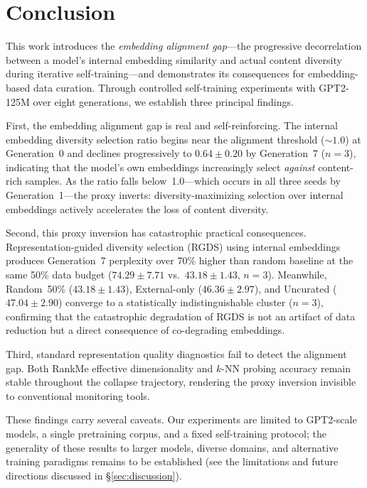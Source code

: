 \section{Conclusion}
\label{sec:conclusion}

This work introduces the \emph{embedding alignment gap}---the progressive decorrelation between a model's internal embedding similarity and actual content diversity during iterative self-training---and demonstrates its consequences for embedding-based data curation. Through controlled self-training experiments with GPT2-125M over eight generations, we establish three principal findings.

First, the embedding alignment gap is real and self-reinforcing. The internal embedding diversity selection ratio begins near the alignment threshold (${\sim}1.0$) at Generation~0 and declines progressively to $0.64 \pm 0.20$ by Generation~7 ($n{=}3$), indicating that the model's own embeddings increasingly select \emph{against} content-rich samples. As the ratio falls below~1.0---which occurs in all three seeds by Generation~1---the proxy inverts: diversity-maximizing selection over internal embeddings actively accelerates the loss of content diversity.

Second, this proxy inversion has catastrophic practical consequences. Representation-guided diversity selection (RGDS) using internal embeddings produces Generation~7 perplexity over 70\% higher than random baseline at the same 50\% data budget ($74.29 \pm 7.71$ vs.\ $43.18 \pm 1.43$, $n{=}3$). Meanwhile, Random~50\% ($43.18 \pm 1.43$), External-only ($46.36 \pm 2.97$), and Uncurated ($47.04 \pm 2.90$) converge to a statistically indistinguishable cluster ($n{=}3$), confirming that the catastrophic degradation of RGDS is not an artifact of data reduction but a direct consequence of co-degrading embeddings.

Third, standard representation quality diagnostics fail to detect the alignment gap. Both RankMe effective dimensionality and $k$-NN probing accuracy remain stable throughout the collapse trajectory, rendering the proxy inversion invisible to conventional monitoring tools.

These findings carry several caveats. Our experiments are limited to GPT2-scale models, a single pretraining corpus, and a fixed self-training protocol; the generality of these results to larger models, diverse domains, and alternative training paradigms remains to be established (see the limitations and future directions discussed in \S\ref{sec:discussion}).


